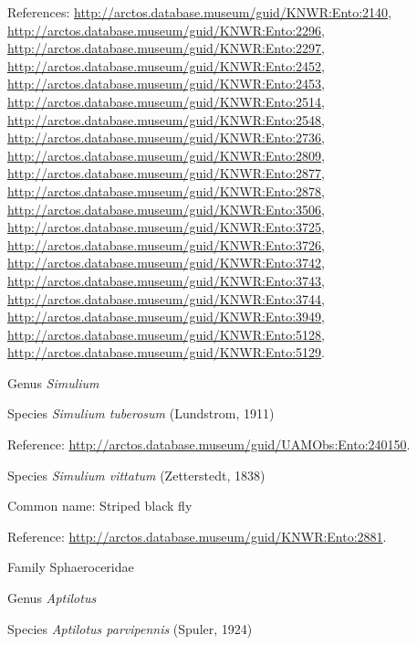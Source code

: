 \documentclass[9pt, article]{memoir}
\begin{document}
\begin{multicols}{2}
References: 
\url{http://arctos.database.museum/guid/KNWR:Ento:2140}, 
\url{http://arctos.database.museum/guid/KNWR:Ento:2296}, 
\url{http://arctos.database.museum/guid/KNWR:Ento:2297}, 
\url{http://arctos.database.museum/guid/KNWR:Ento:2452}, 
\url{http://arctos.database.museum/guid/KNWR:Ento:2453}, 
\url{http://arctos.database.museum/guid/KNWR:Ento:2514}, 
\url{http://arctos.database.museum/guid/KNWR:Ento:2548}, 
\url{http://arctos.database.museum/guid/KNWR:Ento:2736}, 
\url{http://arctos.database.museum/guid/KNWR:Ento:2809}, 
\url{http://arctos.database.museum/guid/KNWR:Ento:2877}, 
\url{http://arctos.database.museum/guid/KNWR:Ento:2878}, 
\url{http://arctos.database.museum/guid/KNWR:Ento:3506}, 
\url{http://arctos.database.museum/guid/KNWR:Ento:3725}, 
\url{http://arctos.database.museum/guid/KNWR:Ento:3726}, 
\url{http://arctos.database.museum/guid/KNWR:Ento:3742}, 
\url{http://arctos.database.museum/guid/KNWR:Ento:3743}, 
\url{http://arctos.database.museum/guid/KNWR:Ento:3744}, 
\url{http://arctos.database.museum/guid/KNWR:Ento:3949}, 
\url{http://arctos.database.museum/guid/KNWR:Ento:5128}, 
\url{http://arctos.database.museum/guid/KNWR:Ento:5129}.

\vspace{6pt}\noindent\hspace{30pt}Genus \textit{Simulium}


\vspace{6pt}\noindent\hspace{36pt}Species \textit{Simulium tuberosum} (Lundstrom, 1911)


Reference: 
\url{http://arctos.database.museum/guid/UAMObs:Ento:240150}.

\vspace{6pt}\noindent\hspace{36pt}Species \textit{Simulium vittatum} (Zetterstedt, 1838)


Common name: Striped black fly

Reference: 
\url{http://arctos.database.museum/guid/KNWR:Ento:2881}.

\vspace{6pt}\noindent\hspace{24pt}Family Sphaeroceridae


\vspace{6pt}\noindent\hspace{30pt}Genus \textit{Aptilotus}


\vspace{6pt}\noindent\hspace{36pt}Species \textit{Aptilotus parvipennis} (Spuler, 1924)



\end{multicols}
\end{document}
